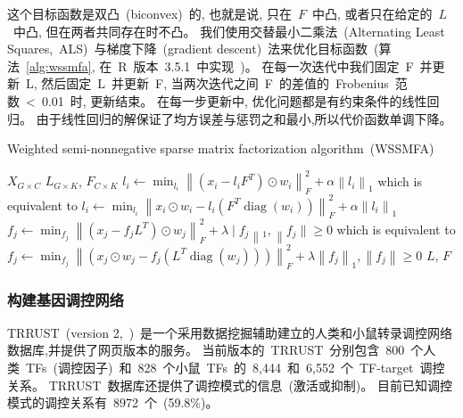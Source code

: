 这个目标函数是双凸~(biconvex)~的, 也就是说, 只在~$F$~中凸, 或者只在给定的~$L$~中凸, 但在两者共同存在时不凸。
我们使用交替最小二乘法~(Alternating Least Squares,~ALS)~与梯度下降~(gradient descent)~法来优化目标函数~(算法~\ref{alg:wssmfa}, 
在~R~版本~3.5.1~中实现~\cite{goeman2012penalized,goeman2010l1})。
在每一次迭代中我们固定~F~并更新~L, 然后固定~L~并更新~F, 当两次迭代之间~F~的差值的~Frobenius~范数~<~0.01~时, 更新结束。
在每一步更新中, 优化问题都是有约束条件的线性回归。
由于线性回归的解保证了均方误差与惩罚之和最小,所以代价函数单调下降。
\begin{algorithm}
    \caption{Weighted semi-nonnegative sparse matrix factorization algorithm~(WSSMFA)}
    \label{alg:wssmfa}
    \begin{algorithmic}[1]
    \Require  $X_{G \times C}$                                   
    \Ensure $L_{G \times K}$, $F_{C \times K}$                
                \State $l_{i} \leftarrow \min _{l_{i}}\left\|\left(x_{i}-l_{i} F^{T}\right) \odot w_{i}\right\|_{F}^{2}+\alpha\left\|l_{i}\right\|_{1}$
                \State which is equivalent to 
                \State $l_{i} \leftarrow \min _{l_{i}}\left\|x_{i} \odot w_{i}-l_{i}\left(F^{T} \operatorname{diag}\left(w_{i}\right)\right)\right\|_{F}^{2}+\alpha\left\|l_{i}\right\|_{1}$
            \EndFor
                \State $f_{j} \leftarrow \min _{f_{j}}\left\|\left(x_{j}-f_{j} L^{T}\right) \odot w_{j}\right\|_{F}^{2}+\lambda \mid f_{j}\left\|_{1},\right\| f_{j} \| \geq 0$
                \State which is equivalent to 
                \State $f_{j} \leftarrow \min _{f_{j}}\left\|\left(x_{j} \odot w_{j}-f_{j}\left(L^{T} \operatorname{diag}\left(w_{j}\right)\right)\right)\right\|_{F}^{2}+\lambda\left\|f_{j}\right\|_{1},\left\|f_{j}\right\| \geq 0$
            \EndFor
        \EndWhile  
        \State \Return $L$, $F$        
  \end{algorithmic}
\end{algorithm}

\subsubsection{构建基因调控网络}
TRRUST~(version 2,~\cite{han2018trrust})~是一个采用数据挖掘辅助建立的人类和小鼠转录调控网络数据库,并提供了网页版本的服务。
当前版本的~TRRUST~分别包含~800~个人类~TFs~(调控因子)~和~828~个小鼠~TFs~的~8,444~和~6,552~个~TF-target~调控关系。
TRRUST~数据库还提供了调控模式的信息~(激活或抑制)。
目前已知调控模式的调控关系有~8972~个~(59.8\%)。

